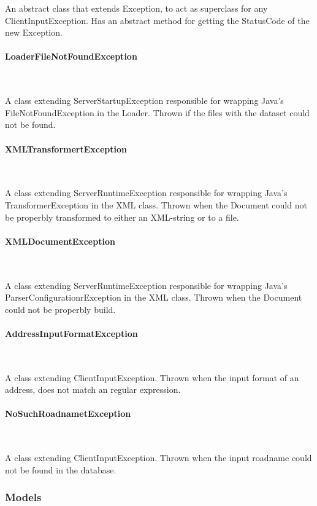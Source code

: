 \documentclass[a4paper,10pt,titlepage]{article}
\begin{document}
An abstract class that extends Exception, to act as superclass for any ClientInputException. Has an abstract method for getting the StatusCode of the new Exception.

				\paragraph{LoaderFileNotFoundException}\mbox{}\

A class extending ServerStartupException responsible for wrapping Java's FileNotFoundException in the Loader. Thrown if the files with the dataset could not be found.

				\paragraph{XMLTransformertException}\mbox{}\

A class extending ServerRuntimeException responsible for wrapping Java's TransformerException in the XML class. Thrown when the Document could not be properbly transformed to either an XML-string or to a file.

				\paragraph{XMLDocumentException}\mbox{}\

A class extending ServerRuntimeException responsible for wrapping Java's ParserConfigurationrException in the XML class. Thrown when the Document could not be properbly build.
				
				\paragraph{AddressInputFormatException}\mbox{}\

A class extending ClientInputException. Thrown when the input format of an address, does not match an regular expression.

				\paragraph{NoSuchRoadnametException}\mbox{}\

A class extending ClientInputException. Thrown when the input roadname could not be found in the database.
				
			\subsubsection{Models}
			
\end{document}
